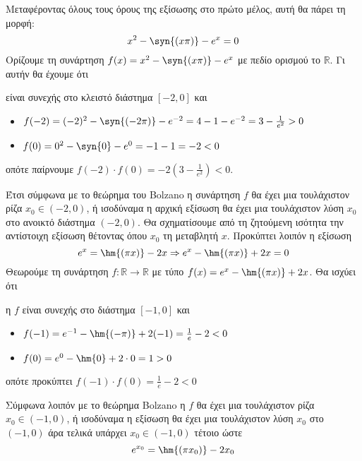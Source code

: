\documentclass[11pt,a4paper]{article}
\begin{document}
Μεταφέροντας όλους τους όρους της εξίσωσης στο πρώτο μέλος, αυτή θα πάρει τη μορφή:
\[ x^2-\syn{(x\pi)}-e^x=0 \]
Ορίζουμε τη συνάρτηση $ f(x)=x^2-\syn{(x\pi)}-e^x $ με πεδίο ορισμού το $ \mathbb{R} $. Γι αυτήν θα έχουμε ότι
\begin{rlist}
\item είναι συνεχής στο κλειστό διάστημα $ [-2,0] $ και
\item \begin{itemize}
\item $ f(-2)=(-2)^2-\syn{(-2\pi)}-e^{-2}=4-1-e^{-2}=3-\frac{1}{e^2}>0 $
\item $ f(0)=0^2-\syn{0}-e^0=-1-1=-2<0 $
\end{itemize}
οπότε παίρνουμε $ f(-2)\cdot f(0)=-2\left(3-\frac{1}{e^2} \right)<0 $.
\end{rlist}
Έτσι σύμφωνα με το θεώρημα του Bolzano η συνάρτηση $ f $ θα έχει μια τουλάχιστον ρίζα $ x_0\in(-2,0) $, ή ισοδύναμα η αρχική εξίσωση θα έχει μια τουλάχιστον λύση $ x_0 $ στο ανοικτό διάστημα $ (-2,0) $.
Θα σχηματίσουμε από τη ζητούμενη ισότητα την αντίστοιχη εξίσωση θέτοντας όπου $ x_0 $ τη μεταβλητή $ x $. Προκύπτει λοιπόν η εξίσωση
\[ e^{x}=\hm{(\pi x)}-2x\Rightarrow e^{x}-\hm{(\pi x)}+2x=0 \]
Θεωρούμε τη συνάρτηση $ f:\mathbb{R}\to\mathbb{R} $ με τύπο $ f(x)=e^{x}-\hm{(\pi x)}+2x $. Θα ισχύει ότι
\begin{rlist}
\item η $ f $ είναι συνεχής στο διάστημα $ [-1,0] $ και
\item \begin{itemize}
\item $ f(-1)=e^{-1}-\hm{(-\pi)}+2(-1)=\frac{1}{e}-2<0 $
\item $ f(0)=e^0-\hm{0}+2\cdot 0=1>0 $
\end{itemize}
οπότε προκύπτει $ f(-1)\cdot f(0)=\frac{1}{e}-2<0 $
\end{rlist}
Σύμφωνα λοιπόν με το θεώρημα Bolzano η $ f $ θα έχει μια τουλάχιστον ρίζα $ x_0\in(-1,0) $, ή ισοδύναμα η εξίσωση θα έχει μια τουλάχιστον λύση $ x_0 $ στο $ (-1,0) $ άρα τελικά υπάρχει $ x_0\in(-1,0) $ τέτοιο ώστε
\[ e^{x_0}=\hm{(\pi x_0)}-2x_0 \]
\end{document}

